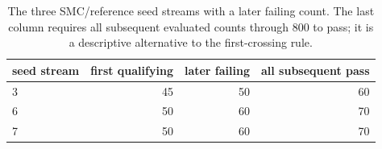 \begin{table}[htbp]
\centering\small
\caption{The three SMC/reference seed streams with a later failing count.
The last column requires all subsequent evaluated counts through 800 to pass;
it is a descriptive alternative to the first-crossing rule.}
\label{tab:reversals}
\begin{tabular}{@{}lrrr@{}}
\toprule
seed stream & first qualifying & later failing & all subsequent pass \\
\midrule
3 & 45 & 50 & 60 \\
6 & 50 & 60 & 70 \\
7 & 50 & 60 & 70 \\
\bottomrule
\end{tabular}
\end{table}
